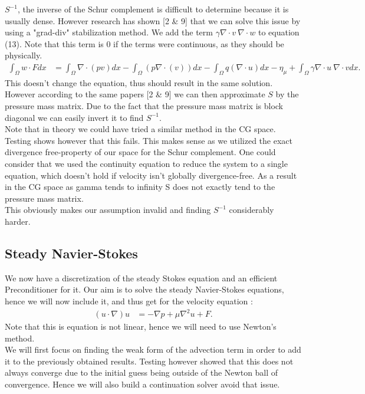 \documentclass[11pt,twoside,a4paper]{article}
\begin{document}
 $S^{-1}$, the inverse of the Schur complement is difficult to determine because it is usually dense. However research has shown [2 \& 9] that we can solve this issue by using a "grad-div" stabilization method. We add the term $\gamma \nabla \cdot v \: \nabla \cdot w$ to equation (13). Note that this term is 0 if the terms were continuous, as they should be physically.
\begin{align}
\int_\Omega w \cdot F dx &= \int_\Omega \nabla \cdot (p v) dx - \int_\Omega ( p \nabla \cdot (v)) dx - \int_\Omega q (\nabla \cdot u) dx  - \eta_\mu + \int_\Omega \gamma \nabla \cdot u \: \nabla \cdot v dx .
\end{align}
This doesn't change the equation, thus should result in the same solution. However according to the same papers [2 \& 9] we can then approximate $S$ by the pressure mass matrix. Due to the fact that the pressure mass matrix is block diagonal we can easily invert it to find $S^{-1}$.
\\
Note that in theory we could have tried a similar method in the CG space.
Testing shows however that this fails.
This makes sense as we utilized the exact divergence free-property of our space for the Schur complement. One could consider that we used the continuity equation to reduce the system to a single equation, which doesn't hold if velocity isn't globally divergence-free.
As a result in the CG space as gamma tends to infinity S does not exactly tend to the pressure mass matrix.\\
This obviously makes our assumption invalid and finding $S^{-1}$ considerably harder.

\subsection{Steady Navier-Stokes}
We now have a discretization of the steady Stokes equation and an efficient Preconditioner for it.
Our aim is to solve the steady Navier-Stokes equations, hence we will now include it, and thus get for the velocity equation :
\begin{align*}
(u \cdot \nabla) u &= -\nabla p + \mu \nabla^2 u + F .
\end{align*}
Note that this is equation is not linear, hence we will need to use Newton's method.\\
We will first focus on finding the weak form of the advection term in order to add it to the previously obtained results. Testing however showed that this does not always converge due to the initial guess being outside of the Newton ball of convergence. Hence we will also build a continuation solver avoid that issue.
\end{document}
